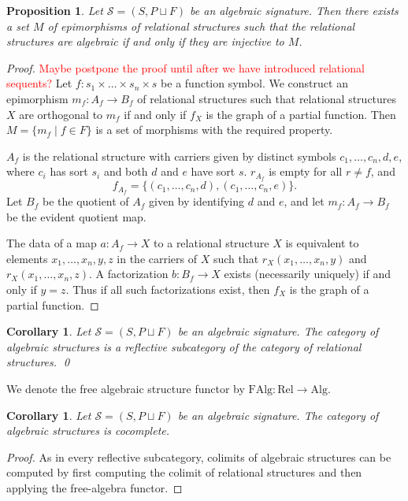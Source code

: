 \documentclass[a4paper]{article}
\newcommand{\todo}[1]{\textcolor{red}{#1}}
\newtheorem{corollary}[theorem]{Corollary}
\newtheorem{proposition}[theorem]{Proposition}
\theoremstyle{remark}
\theoremstyle{definition}
\begin{document}
\begin{proposition}
  Let $\mathcal{S} = (S, P \sqcup F)$ be an algebraic signature.
  Then there exists a set $M$ of epimorphisms of relational structures such that the relational structures are algebraic if and only if they are injective to $M$.
\end{proposition}
\begin{proof}
  \todo{
    Maybe postpone the proof until after we have introduced relational sequents?
  }
  Let $f : s_1 \times \dots \times s_n \times s$ be a function symbol.
  We construct an epimorphism $m_f : A_f \rightarrow B_f$ of relational structures such that relational structures $X$ are orthogonal to $m_f$ if and only if $f_X$ is the graph of a partial function.
  Then $M = \{ m_f \mid f \in F \}$ is a set of morphisms with the required property.

  $A_f$ is the relational structure with carriers given by distinct symbols $c_1, \dots, c_n, d, e$, where $c_i$ has sort $s_i$ and both $d$ and $e$ have sort $s$.
  $r_{A_f}$ is empty for all $r \neq f$, and
  \begin{equation}
    f_{A_f} = \{ (c_1, \dots, c_n, d), (c_1, \dots, c_n, e) \}.
  \end{equation}
  Let $B_f$ be the quotient of $A_f$ given by identifying $d$ and $e$, and let $m_f : A_f \rightarrow B_f$ be the evident quotient map.

  The data of a map $a : A_f \rightarrow X$ to a relational structure $X$ is equivalent to elements $x_1, \dots, x_n, y, z$ in the carriers of $X$ such that $r_X(x_1, \dots, x_n, y)$ and $r_X(x_1, \dots, x_n, z)$.
  A factorization $b : B_f \rightarrow X$ exists (necessarily uniquely) if and only if $y = z$.
  Thus if all such factorizations exist, then $f_X$ is the graph of a partial function.
\end{proof}

\begin{corollary}
  Let $\mathcal{S} = (S, P \sqcup F)$ be an algebraic signature.
  The category of algebraic structures is a reflective subcategory of the category of relational structures.
  \qed
\end{corollary}

We denote the free algebraic structure functor by $\mathrm{FAlg} : \mathrm{Rel} \rightarrow \mathrm{Alg}$.

\begin{corollary}
  Let $\mathcal{S} = (S, P \sqcup F)$ be an algebraic signature.
  The category of algebraic structures is cocomplete.
\end{corollary}
\begin{proof}
  As in every reflective subcategory, colimits of algebraic structures can be computed by first computing the colimit of relational structures and then applying the free-algebra functor.
\end{proof}
\end{document}
